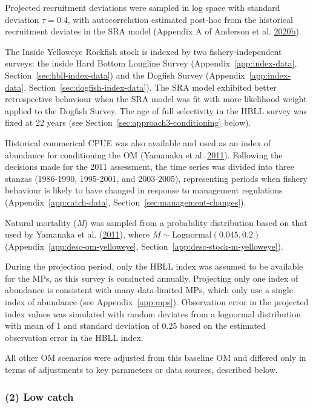 \documentclass[11pt]{book}
\begin{document}
Projected recruitment deviations were sampled in log space with standard deviation \(\tau = 0.4\), with autocorrelation estimated post-hoc from the historical recruitment deviates in the SRA model (Appendix A of Anderson et al. \protect\hyperlink{ref-anderson2020gfmp}{2020}\protect\hyperlink{ref-anderson2020gfmp}{b}).

The Inside Yelloweye Rockfish stock is indexed by two fishery-independent surveys: the inside Hard Bottom Longline Survey (Appendix~\ref{app:index-data}, Section~\ref{sec:hbll-index-data}) and the Dogfish Survey (Appendix~\ref{app:index-data}, Section~\ref{sec:dogfish-index-data}). The SRA model exhibited better retrospective behaviour when the SRA model was fit with more likelihood weight applied to the Dogfish Survey. The age of full selectivity in the HBLL survey was fixed at 22 years (see Section~\ref{sec:approach3-conditioning} below).

Historical commerical CPUE was also available and used as an index of abundance for conditioning the OM (Yamanaka et al. \protect\hyperlink{ref-yamanaka2011}{2011}). Following the decisions made for the 2011 assessment, the time series was divided into three stanzas (1986-1990, 1995-2001, and 2003-2005), representing periods when fishery behaviour is likely to have changed in response to management regulations (Appendix~\ref{app:catch-data}, Section~\ref{sec:management-changes}).

Natural mortality (\emph{M}) was sampled from a probability distribution based on that used by Yamanaka et al. (\protect\hyperlink{ref-yamanaka2011}{2011}), where \(M \sim \textrm{Lognormal}(0.045, 0.2)\) (Appendix~\ref{app:desc-om-yelloweye}, Section~\ref{app:desc-stock-m-yelloweye}).

During the projection period, only the HBLL index was assumed to be available for the MPs, as this survey is conducted annually. Projecting only one index of abundance is consistent with many data-limited MPs, which only use a single index of abundance (see Appendix~\ref{app:mps}). Observation error in the projected index values was simulated with random deviates from a lognormal distribution with mean of 1 and standard deviation of 0.25 based on the estimated observation error in the HBLL index.

All other OM scenarios were adjusted from this baseline OM and differed only in terms of adjustments to key parameters or data sources, described below.

\hypertarget{sec:approach3-reference2}{%
\subsubsection{(2) Low catch}\label{sec:approach3-reference2}}
\end{document}
